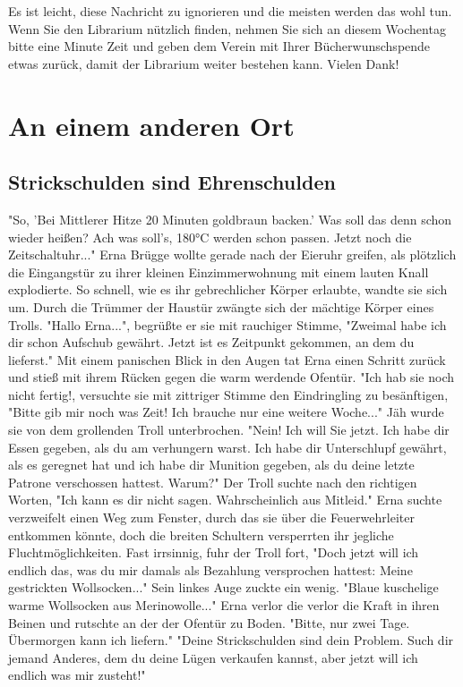 Es ist leicht, diese Nachricht zu ignorieren und die meisten werden das
wohl tun. Wenn Sie den Librarium nützlich finden, nehmen Sie sich an
diesem Wochentag bitte eine Minute Zeit und geben dem Verein mit Ihrer
Bücherwunschspende etwas zurück, damit der Librarium weiter bestehen
kann. Vielen Dank!

\section{An einem anderen Ort}

\subsection{Strickschulden sind Ehrenschulden}
"So, 'Bei Mittlerer Hitze 20 Minuten goldbraun backen.' Was soll das
denn schon wieder heißen? Ach was soll's, 180°C werden schon passen.
Jetzt noch die Zeitschaltuhr..."
Erna Brügge wollte gerade nach der Eieruhr greifen, als plötzlich die
Eingangstür zu ihrer kleinen Einzimmerwohnung mit einem lauten Knall
explodierte. So schnell, wie es ihr gebrechlicher Körper erlaubte,
wandte sie sich um. Durch die Trümmer der Haustür zwängte sich der
mächtige Körper eines Trolls.
"Hallo Erna...", begrüßte er sie mit rauchiger Stimme, "Zweimal habe ich
dir schon Aufschub gewährt. Jetzt ist es Zeitpunkt gekommen, an dem du
lieferst."
Mit einem panischen Blick in den Augen tat Erna einen Schritt zurück und
stieß mit ihrem Rücken gegen die warm werdende Ofentür.
"Ich hab sie noch nicht fertig!, versuchte sie mit zittriger Stimme den
Eindringling zu besänftigen, "Bitte gib mir noch was Zeit! Ich brauche
nur eine weitere Woche..."
Jäh wurde sie von dem grollenden Troll unterbrochen. "Nein! Ich will Sie
jetzt. Ich habe dir Essen gegeben, als du am verhungern warst. Ich habe
dir Unterschlupf gewährt, als es geregnet hat und ich habe dir Munition
gegeben, als du deine letzte Patrone verschossen hattest. Warum?" Der
Troll suchte nach den richtigen Worten, "Ich kann es dir nicht sagen.
Wahrscheinlich aus Mitleid."
Erna suchte verzweifelt einen Weg zum Fenster, durch das sie über die
Feuerwehrleiter entkommen könnte, doch die breiten Schultern versperrten
ihr jegliche Fluchtmöglichkeiten.
Fast irrsinnig, fuhr der Troll fort, "Doch jetzt will ich endlich das,
was du mir damals als Bezahlung versprochen hattest: Meine gestrickten
Wollsocken..." Sein linkes Auge zuckte ein wenig. "Blaue kuschelige
warme Wollsocken aus Merinowolle..."
Erna verlor die verlor die Kraft in ihren Beinen und rutschte an der der
Ofentür zu Boden.
"Bitte, nur zwei Tage. Übermorgen kann ich liefern."
"Deine Strickschulden sind dein Problem. Such dir jemand Anderes, dem du
deine Lügen verkaufen kannst, aber jetzt will ich endlich was mir zusteht!"

